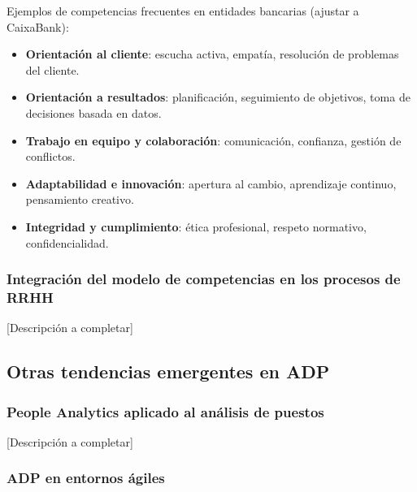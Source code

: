 Ejemplos de competencias frecuentes en entidades bancarias (ajustar a CaixaBank):
\begin{itemize}
  \item \textbf{Orientación al cliente}: escucha activa, empatía, resolución
        de problemas del cliente.
  \item \textbf{Orientación a resultados}: planificación, seguimiento de objetivos,
        toma de decisiones basada en datos.
  \item \textbf{Trabajo en equipo y colaboración}: comunicación, confianza,
        gestión de conflictos.
  \item \textbf{Adaptabilidad e innovación}: apertura al cambio, aprendizaje
        continuo, pensamiento creativo.
  \item \textbf{Integridad y cumplimiento}: ética profesional, respeto normativo,
        confidencialidad.
\end{itemize}

\subsubsection{Integración del modelo de competencias en los procesos de RRHH}


[Descripción a completar]

\subsection{Otras tendencias emergentes en ADP}

\subsubsection{People Analytics aplicado al análisis de puestos}


[Descripción a completar]

\subsubsection{ADP en entornos ágiles}

